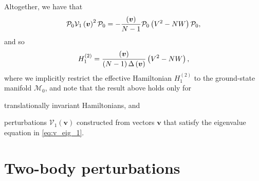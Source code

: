 \documentclass[nofootinbib,notitlepage,11pt]{revtex4-2}
\newcommand{\f}[2]{\dfrac{#1}{#2}} %
\newcommand{\p}[1]{\left(#1\right)} %
\renewcommand{\v}{\bm} %
\newcommand{\1}{\mathds{1}}
\newcommand{\M}{\mathcal{M}}
\renewcommand{\P}{\mathcal{P}}
\newcommand{\V}{\mathcal{V}}
\let\var\relax
\DeclareMathOperator{\var}{var}
\begin{document}
Altogether, we have that
\begin{align}
  \P_0 \V_1\p{\v v}^2 \P_0
  = -\f{\var\p{\v v}}{N-1} \P_0 \p{V^2 - N W} \P_0,
\end{align}
and so
\begin{align}
  H_1^{(2)} = \f{\var\p{\v v}}{\p{N-1}\Delta\p{\v v}} \p{V^2 - N W},
\end{align}
where we implicitly restrict the effective Hamiltonian $H_1^{(2)}$ to
the ground-state manifold $\M_0$, and note that the result above holds
only for
\begin{enumerate*}
\item translationally invariant Hamiltonians, and
\item perturbations $\V_1\p{\v v}$ constructed from vectors $\v v$
  that satisfy the eigenvalue equation in \eqref{eq:v_eig_1}.
\end{enumerate*}

\section{Two-body perturbations}
\end{document}
